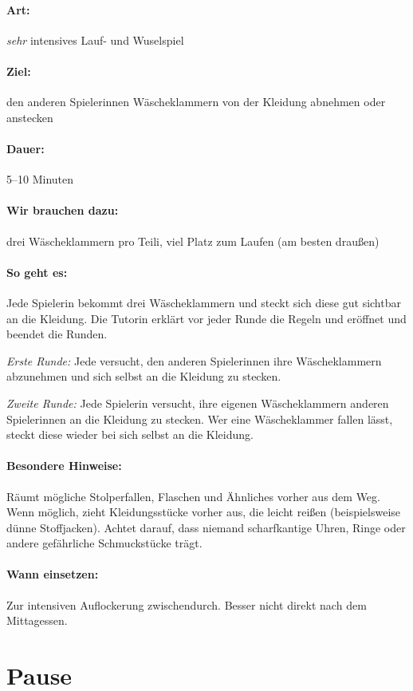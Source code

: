 \paragraph{Art:} \emph{sehr} intensives Lauf- und Wuselspiel
\paragraph{Ziel:} den anderen Spielerinnen Wäscheklammern von der Kleidung abnehmen oder anstecken
\paragraph{Dauer:} 5--10 Minuten
\paragraph{Wir brauchen dazu:} drei Wäscheklammern pro Teili, viel Platz zum Laufen (am besten draußen)
\paragraph{So geht es:} Jede Spielerin bekommt drei Wäscheklammern und steckt sich diese gut sichtbar an die Kleidung. Die Tutorin erklärt vor jeder Runde die Regeln und eröffnet und beendet die Runden.

\emph{Erste Runde:} Jede versucht, den anderen Spielerinnen ihre Wäscheklammern abzunehmen und sich selbst an die Kleidung zu stecken.

\emph{Zweite Runde:} Jede Spielerin versucht, ihre eigenen Wäscheklammern anderen Spielerinnen an die Kleidung zu stecken. Wer eine Wäscheklammer fallen lässt, steckt diese wieder bei sich selbst an die Kleidung.

\paragraph{Besondere Hinweise:} Räumt mögliche Stolperfallen, Flaschen und Ähnliches vorher aus dem Weg. Wenn möglich, zieht Kleidungsstücke vorher aus, die leicht reißen (beispielsweise dünne Stoffjacken). Achtet darauf, dass niemand scharfkantige Uhren, Ringe oder andere gefährliche Schmuckstücke trägt.
\paragraph{Wann einsetzen:} Zur intensiven Auflockerung zwischendurch. Besser nicht direkt nach dem Mittagessen.


\section{Pause}

